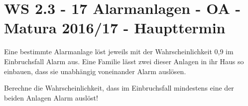 \section{WS 2.3 - 17 Alarmanlagen - OA - Matura 2016/17 - Haupttermin}

\begin{beispiel}[WS 2.3]{1} %
Eine bestimmte Alarmanlage löst jeweils mit der Wahrscheinlichkeit 0,9 im Einbruchsfall Alarm aus. Eine Familie lässt zwei dieser Anlagen in ihr Haus so einbauen, dass sie unabhängig voneinander Alarm auslösen. \leer

Berechne die Wahrscheinlichkeit, dass im Einbruchsfall mindestens eine der beiden Anlagen
Alarm auslöst!	

\end{beispiel}
